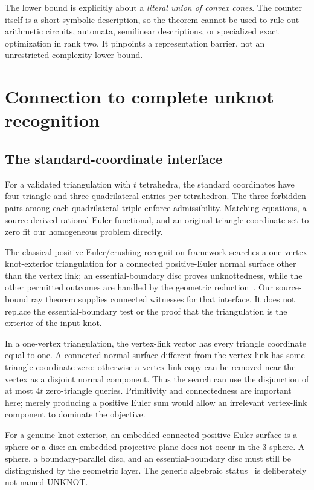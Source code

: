 The lower bound is explicitly about a \emph{literal union of convex cones}.
The counter itself is a short symbolic description, so the theorem cannot be
used to rule out arithmetic circuits, automata, semilinear descriptions, or
specialized exact optimization in rank two. It pinpoints a representation
barrier, not an unrestricted complexity lower bound.

\section{Connection to complete unknot recognition}
\label{sec:geometry}

\subsection{The standard-coordinate interface}

For a validated triangulation with $t$ tetrahedra, the standard coordinates
have four triangle and three quadrilateral entries per tetrahedron. The three
forbidden pairs among each quadrilateral triple enforce admissibility. Matching
equations, a source-derived rational Euler functional, and an original triangle
coordinate set to zero fit our homogeneous problem directly.

The classical positive-Euler/crushing recognition framework searches a
one-vertex knot-exterior triangulation for a connected positive-Euler normal
surface other than the vertex link; an essential-boundary disc proves
unknottedness, while the other permitted outcomes are handled by the geometric
reduction~\cite{bo}. Our source-bound ray theorem supplies connected witnesses
for that interface. It does not replace the essential-boundary test or the
proof that the triangulation is the exterior of the input knot.

In a one-vertex triangulation, the vertex-link vector has every triangle
coordinate equal to one. A connected normal surface different from the vertex
link has some triangle coordinate zero: otherwise a vertex-link copy can be
removed near the vertex as a disjoint normal component. Thus the search can
use the disjunction of at most $4t$ zero-triangle queries. Primitivity and
connectedness are important here; merely producing a positive Euler sum would
allow an irrelevant vertex-link component to dominate the objective.

For a genuine knot exterior, an embedded connected positive-Euler surface is
a sphere or a disc: an embedded projective plane does not occur in the
3-sphere. A sphere, a boundary-parallel disc, and an essential-boundary disc
must still be distinguished by the geometric layer. The generic algebraic
status \pos\ is deliberately not named \textsf{UNKNOT}.

